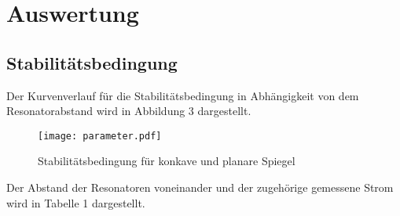 \section{Auswertung}
\label{sec:Auswertung}


\subsection{Stabilitätsbedingung}
Der Kurvenverlauf für die Stabilitätsbedingung in Abhängigkeit von dem Resonatorabstand wird in Abbildung 3
dargestellt.

\begin{figure}[H]
  \centering
  \texttt{[image: parameter.pdf]}
  \caption{Stabilitätsbedingung für konkave und planare Spiegel}
  \label{fig:plot}
\end{figure}

Der Abstand der Resonatoren voneinander und der zugehörige gemessene Strom wird in Tabelle 1 dargestellt.


